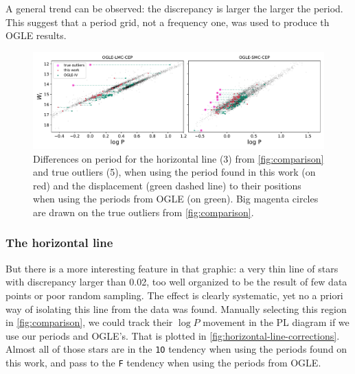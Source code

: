 A general trend can be observed: the discrepancy is larger the larger the period.
This suggest that a period grid, not a frequency one, was used to produce th OGLE results.

\begin{figure}
	\centering
	\includegraphics[width=\textwidth]{img/horizontal_line_corrections.pdf}
	\caption[Displacement of some stars between pulsation modes]{
		Differences on period for the horizontal line (3) from \autoref{fig:comparison} and true outliers (5), when using the period found in this work (on red)
		and the displacement  (green dashed line) to their positions when using the periods from OGLE (on green).
		Big magenta circles are drawn on the true outliers from  \autoref{fig:comparison}.
	}
	\label{fig:horizontal-line-corrections}
\end{figure}

\subsubsection{The horizontal line}

But there is a more interesting feature in that graphic: a very thin line of stars with discrepancy larger than 0.02, 
too well organized to be the result of few data points or poor random sampling.
The effect is clearly systematic, yet no a priori way of isolating this line from the data was found.
Manually selecting this region in \autoref{fig:comparison}, 
we could track their $\log P$ movement in the PL diagram if we use our periods and OGLE's.
That is plotted in \autoref{fig:horizontal-line-corrections}.
Almost all of those stars are in the \texttt{1O} tendency when using the periods found on this work,
and pass to the \texttt{F} tendency when using the periods from OGLE. 

